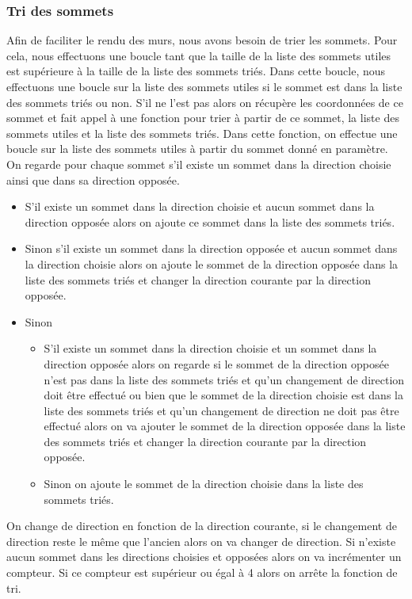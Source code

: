 \documentclass[11pt]{article}
\begin{document}
\subsubsection{Tri des sommets}
Afin de faciliter le rendu des murs, nous avons besoin de trier les sommets. Pour cela, nous effectuons une boucle tant que la taille de la liste des sommets utiles est supérieure à la taille de la liste des sommets triés. Dans cette boucle, nous effectuons une boucle sur la liste des sommets utiles si le sommet est dans la liste des sommets triés ou non. S'il ne l'est pas alors on récupère les coordonnées de ce sommet et fait appel à une fonction pour trier à partir de ce sommet, la liste des sommets utiles et la liste des sommets triés. Dans cette fonction, on effectue une boucle sur la liste des sommets utiles à partir du sommet donné en paramètre. On regarde pour chaque sommet s'il existe un sommet dans la direction choisie ainsi que dans sa direction opposée. %
\begin{itemize}
	\item S'il existe un sommet dans la direction choisie et aucun sommet dans la direction opposée alors on ajoute ce sommet dans la liste des sommets triés.
	\item Sinon s'il existe un sommet dans la direction opposée et aucun sommet dans la direction choisie alors on ajoute le sommet de la direction opposée dans la liste des sommets triés et changer la direction courante par la direction opposée.
	\item Sinon
	\begin{itemize}
		\item S'il existe un sommet dans la direction choisie et un sommet dans la direction opposée alors on regarde si le sommet de la direction opposée n'est pas dans la liste des sommets triés et qu'un changement de direction doit être effectué ou bien que le sommet de la direction choisie est dans la liste des sommets triés et qu'un changement de direction ne doit pas être effectué alors on va ajouter le sommet de la direction opposée dans la liste des sommets triés et changer la direction courante par la direction opposée.
		\item Sinon on ajoute le sommet de la direction choisie dans la liste des sommets triés.
	\end{itemize}
\end{itemize}

On change de direction en fonction de la direction courante, si le changement de direction reste le même que l'ancien alors on va changer de direction. Si n'existe aucun sommet dans les directions choisies et opposées alors on va incrémenter un compteur. Si ce compteur est supérieur ou égal à 4 alors on arrête la fonction de tri.
\end{document}
